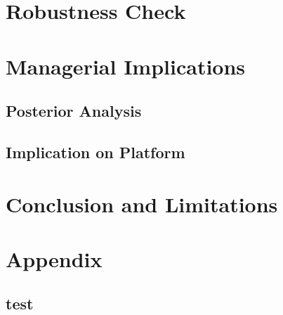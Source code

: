 \documentclass[a4paper, 12pt]{article}
\begin{document}
\section{Robustness Check}
\section{Managerial Implications}
\subsection{Posterior Analysis}
\subsection{Implication on Platform}
\section{Conclusion and Limitations}


\clearpage
\setcounter{section}{0}
\setcounter{subsection}{0}
\setcounter{equation}{0}
\setcounter{table}{0}
\setcounter{figure}{0}
\renewcommand{\thesection}{\Alph{section}}
\renewcommand{\theequation}{\thesection.\arabic{equation}}
\renewcommand{\thesubsection}{\thesection.\arabic{subsection}}
\renewcommand{\thetable}{\thesection.\arabic{table}}
\renewcommand{\thefigure}{\thesection.\arabic{figure}}
\section{Appendix} \label{sec:app}
\subsection{test}


\clearpage


\end{document}
